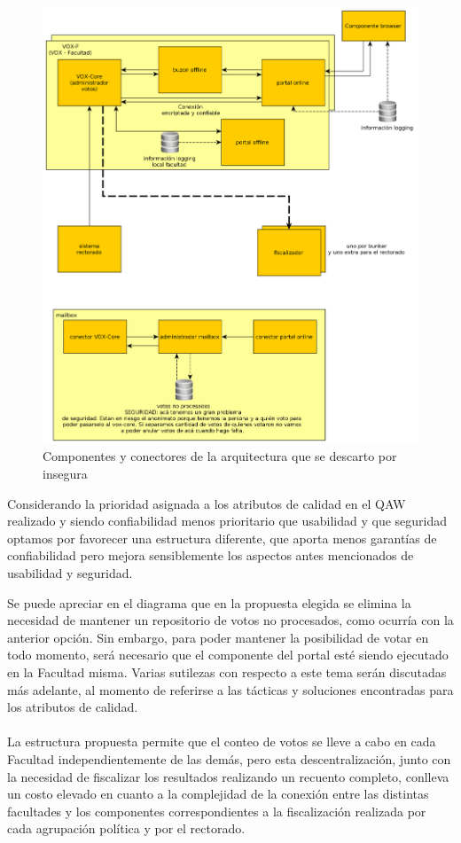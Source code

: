 \begin{figure}[H]
	\begin{center}
		\includegraphics[scale=0.26]{../diagramas/arquitecturaInsegura.png}
		\caption{Componentes y conectores de la arquitectura que se descarto por insegura}
	\end{center} 
\end{figure}

Considerando la prioridad asignada a los atributos de calidad en el QAW realizado y siendo confiabilidad menos prioritario que usabilidad y que seguridad optamos por favorecer una estructura diferente, que aporta menos garantías de confiabilidad pero mejora sensiblemente los aspectos antes mencionados de usabilidad y seguridad.

Se puede apreciar en el diagrama %
que en la propuesta elegida se elimina la necesidad de mantener un repositorio de votos no procesados, como ocurría con la anterior opción. Sin embargo, para poder mantener la posibilidad de votar en todo momento, será necesario que el componente del portal esté siendo ejecutado en la Facultad misma. Varias sutilezas con respecto a este tema serán discutadas más adelante, al momento de referirse a las tácticas y soluciones encontradas para los atributos de calidad.
\\
\\
La estructura propuesta permite que el conteo de votos se lleve a cabo en cada Facultad independientemente de las demás, pero esta descentralización, junto con la necesidad de fiscalizar los resultados realizando un recuento completo, conlleva un costo elevado en cuanto a la complejidad de la conexión entre las distintas facultades y los componentes correspondientes a la fiscalización realizada por cada agrupación política y por el rectorado.

